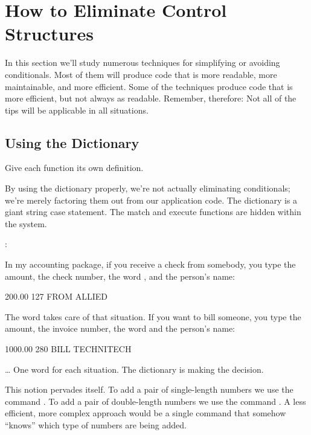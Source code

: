 \section{How to Eliminate Control Structures}
In this section we'll study numerous techniques for simplifying or
avoiding conditionals. Most of them will produce code that is more
readable, more maintainable, and more efficient. Some of the techniques
produce code that is more efficient, but not always as readable.
Remember, therefore: Not all of the tips will be applicable in all
situations.

\subsection{Using the Dictionary}%
%

\begin{tip}
Give each function its own definition.
\end{tip}
By using the \Forth{} dictionary properly, we're not actually eliminating
conditionals; we're merely factoring them out from our application code.
The \Forth{} dictionary is a giant string case statement. The match and
execute functions are hidden within the \Forth{} system.

\begin{interview}
:
\begin{tfquot}
In my accounting package, if you receive a check from somebody, you type
the amount, the check number, the word , and the person's name:

\begin{Code}
200.00 127 FROM ALLIED
\end{Code}
The word  takes care of that situation. If you want to bill someone,
you type the amount, the invoice number, the word  and the person's
name:

\begin{Code}
1000.00 280 BILL TECHNITECH
\end{Code}
\end{tfquot}
\dots{} One word for each situation. The dictionary is making the decision.\medskip
\end{interview}
This notion pervades \Forth{} itself. To add a pair of single-length
numbers we use the command \forth{+}. To add a pair of double-length numbers
we use the command . A less efficient, more complex approach would
be a single command that somehow ``knows'' which type of numbers are
being added.

